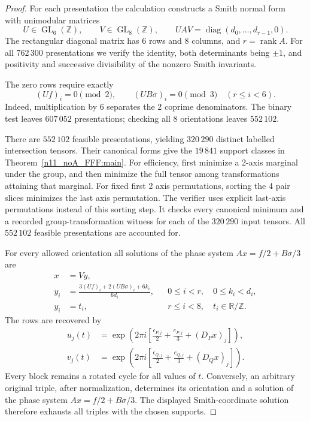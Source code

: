 \documentclass[11pt,a4paper]{article}
\theoremstyle{plain}
\theoremstyle{definition}
\theoremstyle{plain}
\begin{document}
\begin{proof}
For each presentation the calculation constructs a Smith normal form~\cite{KB} with unimodular matrices
$$U\in\operatorname{GL}_6(\mathbb{Z}),\qquad V\in\operatorname{GL}_8(\mathbb{Z}), \qquad UAV=\operatorname{diag}(d_0,\ldots,d_{r-1},0).$$
The rectangular diagonal matrix has 6 rows and 8 columns, and $r=\operatorname{rank}A$. For all $762\,300$ presentations we verify the identity, both determinants being $\pm1$, and positivity and successive divisibility of the nonzero Smith invariants.

The zero rows require exactly
\[
(Uf)_i=0\pmod2,\qquad (UB\sigma)_i=0\pmod3 \quad (r\leq i<6).
\]
Indeed, multiplication by 6 separates the 2 coprime denominators. The binary test leaves $607\,052$ presentations; checking all 8 orientations leaves $552\,102$.

There are $552\,102$ feasible presentations, yielding $320\,290$ distinct labelled intersection tensors. Their canonical forms give the $19\,841$ support classes in Theorem~\ref{n11_noA_FFF:main}. For efficiency, first minimize a 2-axis marginal under the group, and then minimize the full tensor among transformations attaining that marginal. For fixed first 2 axis permutations, sorting the 4 pair slices minimizes the last axis permutation. The verifier uses explicit last-axis permutations instead of this sorting step. It checks every canonical minimum and a recorded group-transformation witness for each of the $320\,290$ input tensors. All $552\,102$ feasible presentations are accounted for.

For every allowed orientation all solutions of the phase system $Ax=f/2+B\sigma/3$ are
\[
\begin{aligned}
x&=Vy,\\
y_i&=\frac{3(Uf)_i+2(UB\sigma)_i+6k_i}{6d_i}, &&0\leq i<r,\quad 0\leq k_i<d_i,\\
y_i&=t_i,&&r\leq i<8,\quad t_i\in\mathbb R/\mathbb{Z}.
\end{aligned}
\]
The rows are recovered by
\begin{align*}
u_j(t)&=\exp\!\left(2\pi i\left[ \frac{\epsilon_{P,j}}2+\frac{e_{P,j}}3+(D_Px)_j\right]\right),\\
v_j(t)&=\exp\!\left(2\pi i\left[ \frac{\epsilon_{Q,j}}2+\frac{e_{Q,j}}3+(D_Qx)_j\right]\right).\nonumber
\end{align*}
Every block remains a rotated cycle for all values of $t$. Conversely, an arbitrary original triple, after normalization, determines its orientation and a solution of the phase system $Ax=f/2+B\sigma/3$. The displayed Smith-coordinate solution therefore exhausts all triples with the chosen supports.


\end{proof}
\end{document}
